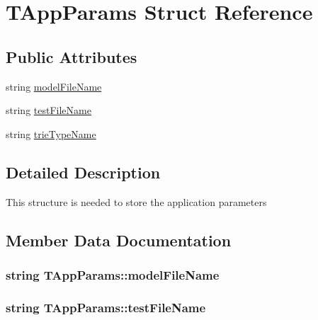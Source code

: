 \hypertarget{struct_t_app_params}{}\section{T\+App\+Params Struct Reference}
\label{struct_t_app_params}
\subsection*{Public Attributes}
\begin{DoxyCompactItemize}
\item 
string \hyperlink{struct_t_app_params_a9100df24fdae6a8a2ebba700389d9afc}{model\+File\+Name}
\item 
string \hyperlink{struct_t_app_params_aa507fd765fbe8670bd55bb79f978a1ba}{test\+File\+Name}
\item 
string \hyperlink{struct_t_app_params_a013e2bf1bb7b68a7807caf4c40caaf86}{trie\+Type\+Name}
\end{DoxyCompactItemize}


\subsection{Detailed Description}
This structure is needed to store the application parameters 

\subsection{Member Data Documentation}
\hypertarget{struct_t_app_params_a9100df24fdae6a8a2ebba700389d9afc}{}
\subsubsection[{model\+File\+Name}]{\setlength{\rightskip}{0pt plus 5cm}string T\+App\+Params\+::model\+File\+Name}\label{struct_t_app_params_a9100df24fdae6a8a2ebba700389d9afc}
\hypertarget{struct_t_app_params_aa507fd765fbe8670bd55bb79f978a1ba}{}
\subsubsection[{test\+File\+Name}]{\setlength{\rightskip}{0pt plus 5cm}string T\+App\+Params\+::test\+File\+Name}\label{struct_t_app_params_aa507fd765fbe8670bd55bb79f978a1ba}
\hypertarget{struct_t_app_params_a013e2bf1bb7b68a7807caf4c40caaf86}{}
